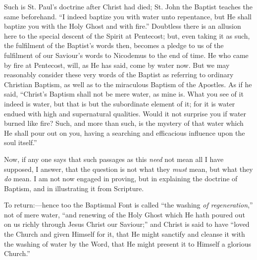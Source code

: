 Such is St. Paul's doctrine after Christ had died; St. John the
Baptist teaches the same beforehand. ``I indeed baptize you with
water unto repentance, but He shall baptize you with the Holy Ghost
and with fire.'' Doubtless there is an allusion here to the
special descent of the Spirit at Pentecost; but, even taking it as
such, the fulfilment of the Baptist's words then, becomes a pledge
to us of the fulfilment of our Saviour's words to Nicodemus to the
end of time. He who came by fire at Pentecost, will, as He has said,
come by water now. But we may reasonably consider these very words of
the Baptist as referring to ordinary Christian Baptism, as well as to
the miraculous Baptism of the Apostles. As if he said, ``Christ's
Baptism shall not be mere water, as mine is. What you see of it indeed
is water, but that is but the subordinate element of it; for it is
water endued with high and supernatural qualities. Would it not
surprise you if water burned like fire? Such, and more than such, is
the mystery of that water which He shall pour out on you, having a
searching and efficacious influence upon the soul itself.''

Now, if any one says that such passages as this \emph{need} not
mean all I have supposed, I answer, that the question is not what they
\emph{must} mean, but what they \emph{do} mean. I am not now engaged
in proving, but in explaining the doctrine of Baptism, and in
illustrating it from Scripture.

To return:—hence too the Baptismal Font is called ``the
washing \emph{of regeneration},'' not of mere water, ``and
renewing of the Holy Ghost which He hath poured out on us richly
through Jesus Christ our Saviour;'' and Christ is said to have
``loved the Church and given Himself for it, that He might
sanctify and cleanse it with the washing of water by the Word, that He
might present it to Himself a glorious Church.''

